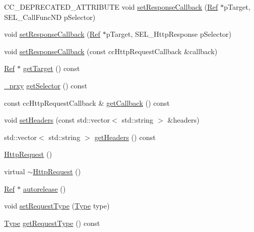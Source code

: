 \begin{DoxyCompactItemize}
\item 
C\+C\+\_\+\+D\+E\+P\+R\+E\+C\+A\+T\+E\+D\+\_\+\+A\+T\+T\+R\+I\+B\+U\+TE void \hyperlink{classnetwork_1_1HttpRequest_a24620015312b35c28a9cb5300d969393}{set\+Response\+Callback} (\hyperlink{classRef}{Ref} $\ast$p\+Target, S\+E\+L\+\_\+\+Call\+Func\+ND p\+Selector)
\item 
void \hyperlink{classnetwork_1_1HttpRequest_a58c485555dd39dfdcbc641cfb6d3fb9a}{set\+Response\+Callback} (\hyperlink{classRef}{Ref} $\ast$p\+Target, S\+E\+L\+\_\+\+Http\+Response p\+Selector)
\item 
void \hyperlink{classnetwork_1_1HttpRequest_adc68acc891305b3066f10f4763e03748}{set\+Response\+Callback} (const cc\+Http\+Request\+Callback \&callback)
\item 
\hyperlink{classRef}{Ref} $\ast$ \hyperlink{classnetwork_1_1HttpRequest_ac372c9d736add6a9c5bdcbfda7f7f1f5}{get\+Target} () const
\item 
\hyperlink{classnetwork_1_1HttpRequest_1_1__prxy}{\+\_\+prxy} \hyperlink{classnetwork_1_1HttpRequest_abe07bda45e38e73f220bf9eb64ea7f85}{get\+Selector} () const
\item 
const cc\+Http\+Request\+Callback \& \hyperlink{classnetwork_1_1HttpRequest_abc46429ca35e9585ddb0a96a744ecee2}{get\+Callback} () const
\item 
void \hyperlink{classnetwork_1_1HttpRequest_aeb33f773e9e3f18864f1945fa3e4e2c4}{set\+Headers} (const std\+::vector$<$ std\+::string $>$ \&headers)
\item 
std\+::vector$<$ std\+::string $>$ \hyperlink{classnetwork_1_1HttpRequest_a3555ebc2bb79d38bf80a36ab9d979e6a}{get\+Headers} () const
\item 
\hyperlink{classnetwork_1_1HttpRequest_ae2e924419ee17ce1bbc87f0122688bb4}{Http\+Request} ()
\item 
virtual \hyperlink{classnetwork_1_1HttpRequest_aeb9ba7fdc3fef6237d611fc9af752bad}{$\sim$\+Http\+Request} ()
\item 
\hyperlink{classRef}{Ref} $\ast$ \hyperlink{classnetwork_1_1HttpRequest_a0fc06041ec6a34d4f92c786a99a91a33}{autorelease} ()
\item 
void \hyperlink{classnetwork_1_1HttpRequest_a07865a1628998a33a57e38cfe254e4cc}{set\+Request\+Type} (\hyperlink{classnetwork_1_1HttpRequest_abcc6d7ee2ea91a721d32fd6d396743fe}{Type} type)
\item 
\hyperlink{classnetwork_1_1HttpRequest_abcc6d7ee2ea91a721d32fd6d396743fe}{Type} \hyperlink{classnetwork_1_1HttpRequest_ad9faf7f8b3f7a86a94f650271eea5442}{get\+Request\+Type} () const

\end{DoxyCompactItemize}
